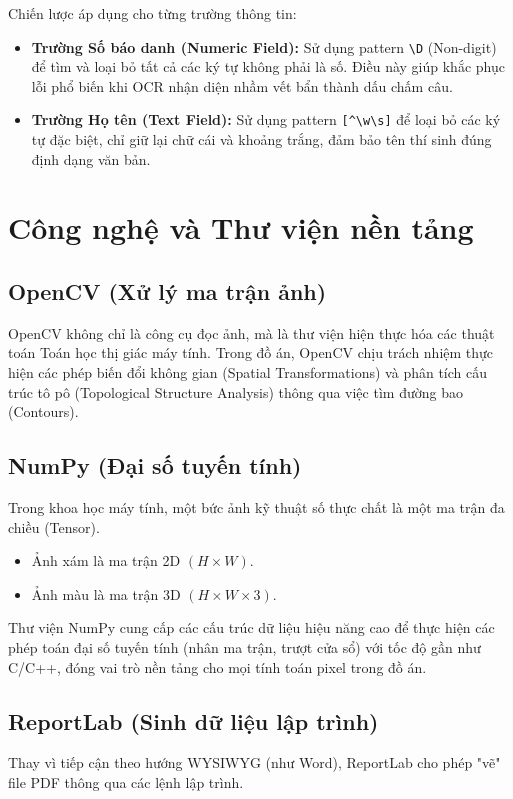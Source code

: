 \documentclass[6pt, a4paper]{report}
\begin{document}
	Chiến lược áp dụng cho từng trường thông tin:
	\begin{itemize}
		\item \textbf{Trường Số báo danh (Numeric Field):} Sử dụng pattern \texttt{\textbackslash D} (Non-digit) để tìm và loại bỏ tất cả các ký tự không phải là số. Điều này giúp khắc phục lỗi phổ biến khi OCR nhận diện nhầm vết bẩn thành dấu chấm câu.
		\item \textbf{Trường Họ tên (Text Field):} Sử dụng pattern \texttt{[\^{}\textbackslash w\textbackslash s]} để loại bỏ các ký tự đặc biệt, chỉ giữ lại chữ cái và khoảng trắng, đảm bảo tên thí sinh đúng định dạng văn bản.
	\end{itemize}
	
	\section{Công nghệ và Thư viện nền tảng}
	
	\subsection{OpenCV (Xử lý ma trận ảnh)}
	OpenCV không chỉ là công cụ đọc ảnh, mà là thư viện hiện thực hóa các thuật toán Toán học thị giác máy tính. Trong đồ án, OpenCV chịu trách nhiệm thực hiện các phép biến đổi không gian (Spatial Transformations) và phân tích cấu trúc tô pô (Topological Structure Analysis) thông qua việc tìm đường bao (Contours).
	
	\subsection{NumPy (Đại số tuyến tính)}
	Trong khoa học máy tính, một bức ảnh kỹ thuật số thực chất là một ma trận đa chiều (Tensor). 
	\begin{itemize}
		\item Ảnh xám là ma trận 2D $(H \times W)$.
		\item Ảnh màu là ma trận 3D $(H \times W \times 3)$.
	\end{itemize}
	Thư viện NumPy cung cấp các cấu trúc dữ liệu hiệu năng cao để thực hiện các phép toán đại số tuyến tính (nhân ma trận, trượt cửa sổ) với tốc độ gần như C/C++, đóng vai trò nền tảng cho mọi tính toán pixel trong đồ án.
	
	\subsection{ReportLab (Sinh dữ liệu lập trình)}
	Thay vì tiếp cận theo hướng WYSIWYG (như Word), ReportLab cho phép "vẽ" file PDF thông qua các lệnh lập trình. 
	
\end{document}
